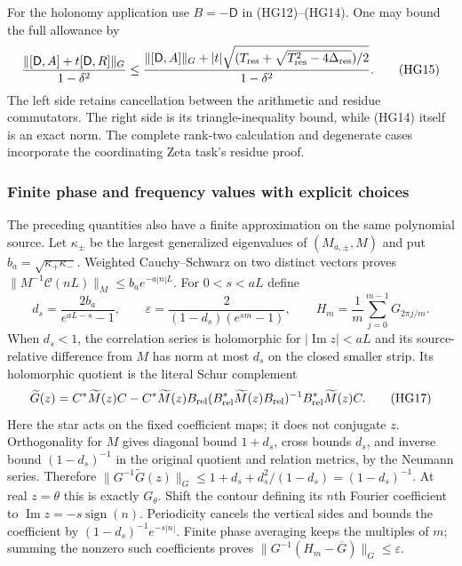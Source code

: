For the holonomy application use $B=-\mathsf D$ in (HG12)--(HG14).
One may bound the full allowance by
\[
 \frac{\|[\mathsf D,A]+t[\mathsf D,R]\|_G}{1-\delta^2}
 \le\frac{\|[\mathsf D,A]\|_G+
 |t|\sqrt{(T_{\rm res}+
 \sqrt{T_{\rm res}^2-4\Delta_{\rm res}})/2}}{1-\delta^2}.
 \tag{HG15}
\]
The left side retains cancellation between the arithmetic and residue
commutators. The right side is its triangle-inequality bound, while
(HG14) itself is an exact norm. The complete rank-two calculation and
degenerate cases incorporate the coordinating Zeta task's residue proof.

\subsubsection{Finite phase and frequency values with explicit choices}

The preceding quantities also have a finite approximation on the same
polynomial source. Let $\kappa_\pm$ be the largest generalized
eigenvalues of $(M_{a,\pm},M)$ and put
$b_a=\sqrt{\kappa_+\kappa_-}$. Weighted Cauchy--Schwarz on two
distinct vectors proves
$\|M^{-1}\mathcal C(nL)\|_M\le b_a e^{-a|n|L}$.
For $0<s<aL$ define
\[
 d_s=\frac{2b_a}{e^{aL-s}-1},\qquad
 \varepsilon=\frac{2}{(1-d_s)(e^{sm}-1)},\qquad
 H_m=\frac1m\sum_{j=0}^{m-1}G_{2\pi j/m} .
 \tag{HG16}
\]
When $d_s<1$, the correlation series is holomorphic for
$|\operatorname{Im}z|<aL$ and its source-relative difference from
$M$ has norm at most $d_s$ on the closed smaller strip. Its
holomorphic quotient is the literal Schur complement
\[
 \widetilde G(z)=C^*\widetilde M(z)C-
 C^*\widetilde M(z)B_{\rm rel}
 (B_{\rm rel}^*\widetilde M(z)B_{\rm rel})^{-1}
 B_{\rm rel}^*\widetilde M(z)C .
 \tag{HG17}
\]
Here the star acts on the fixed coefficient maps; it does not conjugate
$z$. Orthogonality for $M$ gives diagonal bound $1+d_s$, cross bounds
$d_s$, and inverse bound $(1-d_s)^{-1}$ in the original quotient and
relation metrics, by the Neumann series. Therefore
$\|G^{-1}\widetilde G(z)\|_G\le
1+d_s+d_s^2/(1-d_s)=(1-d_s)^{-1}$.
At real $z=\theta$ this is exactly $G_\theta$.
Shift the contour defining its $n$th Fourier coefficient to
$\operatorname{Im}z=-s\operatorname{sign}(n)$. Periodicity cancels
the vertical sides and bounds the coefficient by
$(1-d_s)^{-1}e^{-s|n|}$. Finite phase averaging keeps the multiples
of $m$; summing the nonzero such coefficients proves
$\|G^{-1}(H_m-\overline G)\|_G\le\varepsilon$.

